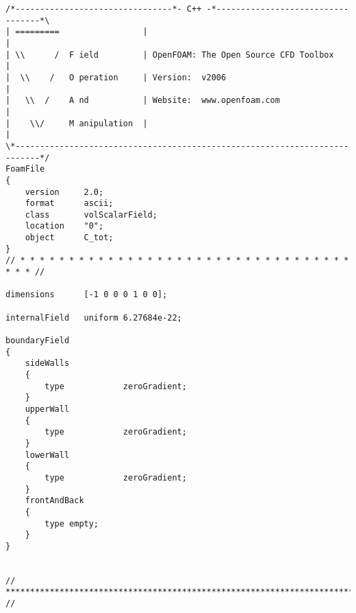 \begin{lstlisting}[style=cpp,title=\texttt{0/C\_tot},captionpos=t]
/*--------------------------------*- C++ -*----------------------------------*\
| =========                 |                                                 |
| \\      /  F ield         | OpenFOAM: The Open Source CFD Toolbox           |
|  \\    /   O peration     | Version:  v2006                                 |
|   \\  /    A nd           | Website:  www.openfoam.com                      |
|    \\/     M anipulation  |                                                 |
\*---------------------------------------------------------------------------*/
FoamFile
{
    version     2.0;
    format      ascii;
    class       volScalarField;
    location    "0";
    object      C_tot;
}
// * * * * * * * * * * * * * * * * * * * * * * * * * * * * * * * * * * * * * //

dimensions      [-1 0 0 0 1 0 0];

internalField   uniform 6.27684e-22;

boundaryField
{
    sideWalls
    {
        type            zeroGradient;
    }
    upperWall
    {
        type            zeroGradient;
    }
    lowerWall
    {
        type            zeroGradient;
    }
    frontAndBack
    { 
        type empty;
    }
}


// ************************************************************************* //

\end{lstlisting}



